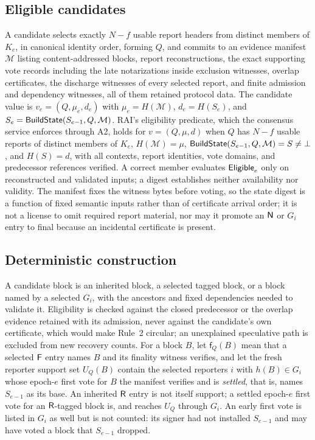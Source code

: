 \subsection{Eligible candidates}
\label{sec:manifest}
A candidate selects exactly $N-f$ usable report headers from distinct members of $K_e$, in canonical identity order, forming $Q$, and commits to an evidence manifest $\mathcal M$ listing content-addressed blocks, report reconstructions, the exact supporting vote records including the late notarizations inside exclusion witnesses, overlap certificates, the discharge witnesses of every selected report, and finite admission and dependency witnesses, all of them retained protocol data. The candidate value is $v_e=(Q,\mu_e,d_e)$ with $\mu_e=H(\mathcal M)$, $d_e=H(S_e)$, and $S_e=\mathsf{BuildState}(S_{e-1},Q,\mathcal M)$. RAI's eligibility predicate, which the consensus service enforces through A2, holds for $v=(Q,\mu,d)$ when $Q$ has $N-f$ usable reports of distinct members of $K_e$, $H(\mathcal M)=\mu$, $\mathsf{BuildState}(S_{e-1},Q,\mathcal M)=S\neq\bot$, and $H(S)=d$, with all contexts, report identities, vote domains, and predecessor references verified. A correct member evaluates $\mathsf{Eligible}_e$ only on reconstructed and validated inputs; a digest establishes neither availability nor validity. The manifest fixes the witness bytes before voting, so the state digest is a function of fixed semantic inputs rather than of certificate arrival order; it is not a license to omit required report material, nor may it promote an $\mathsf{N}$ or $G_i$ entry to final because an incidental certificate is present.

\subsection{Deterministic construction}
\label{sec:build}
A candidate block is an inherited block, a selected tagged block, or a block named by a selected $G_i$, with the ancestors and fixed dependencies needed to validate it. Eligibility is checked against the closed predecessor or the overlap evidence retained with its admission, never against the candidate's own certificate, which would make Rule~2 circular; an unexplained speculative path is excluded from new recovery counts. For a block $B$, let $\mathsf{f}_Q(B)$ mean that a selected $\mathsf{F}$ entry names $B$ and its finality witness verifies, and let the fresh reporter support set $U_Q(B)$ contain the selected reporters $i$ with $h(B)\in G_i$ whose epoch-$e$ first vote for $B$ the manifest verifies and is \emph{settled}, that is, names $S_{e-1}$ as its base. An inherited $\mathsf{R}$ entry is not itself support; a settled epoch-$e$ first vote for an $\mathsf{R}$-tagged block is, and reaches $U_Q$ through $G_i$. An early first vote is listed in $G_i$ as well but is not counted: its signer had not installed $S_{e-1}$ and may have voted a block that $S_{e-1}$ dropped.

